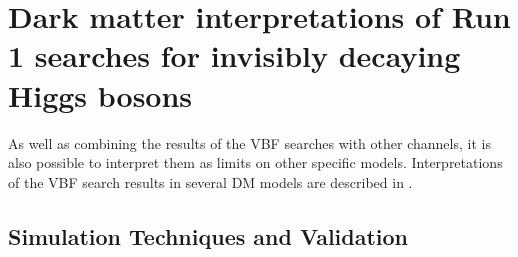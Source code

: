 \chapter{Dark matter interpretations of Run 1 searches for invisibly decaying Higgs bosons}
\label{chap:interp}
As well as combining the results of the \ac{VBF} searches with other channels, it is also possible to interpret them as limits on other specific models. Interpretations of the \ac{VBF} search results in several \ac{DM} models are described in .


\section{Simulation Techniques and Validation}
\label{sec:dmval}

\begin{table}
  \caption{}%
  \label{tab:mgvspowhegdelphes}
  \begin{tabular}{lcc}
    \hline
    \hline
    
    \hline

    \hline
    \hline
  \end{tabular}
\end{table}



